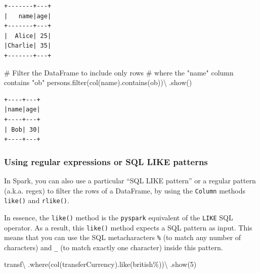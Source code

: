 \documentclass[
  11pt,
  letterpaper,
  DIV=11,
  numbers=noendperiod]{scrreprt}
\newenvironment{Shaded}{\begin{snugshade}}{\end{snugshade}}
\newcommand{\BuiltInTok}[1]{\textcolor[rgb]{0.00,0.23,0.31}{#1}}
\newcommand{\CommentTok}[1]{\textcolor[rgb]{0.37,0.37,0.37}{#1}}
\newcommand{\DecValTok}[1]{\textcolor[rgb]{0.68,0.00,0.00}{#1}}
\newcommand{\NormalTok}[1]{\textcolor[rgb]{0.00,0.23,0.31}{#1}}
\newcommand{\OperatorTok}[1]{\textcolor[rgb]{0.37,0.37,0.37}{#1}}
\newcommand{\StringTok}[1]{\textcolor[rgb]{0.13,0.47,0.30}{#1}}
\begin{document}
\begin{verbatim}
+-------+---+
|   name|age|
+-------+---+
|  Alice| 25|
|Charlie| 35|
+-------+---+
\end{verbatim}

\begin{Shaded}
\begin{Highlighting}[]
\CommentTok{\# Filter the DataFrame to include only rows}
\CommentTok{\# where the "name" column contains "ob"}
\NormalTok{persons.}\BuiltInTok{filter}\NormalTok{(col(}\StringTok{\textquotesingle{}name\textquotesingle{}}\NormalTok{).contains(}\StringTok{\textquotesingle{}ob\textquotesingle{}}\NormalTok{))}\OperatorTok{\textbackslash{}}
\NormalTok{  .show()}
\end{Highlighting}
\end{Shaded}

\begin{verbatim}
+----+---+
|name|age|
+----+---+
| Bob| 30|
+----+---+
\end{verbatim}

\hypertarget{sec-filter-regex-pattern}{%
\subsubsection{Using regular expressions or SQL LIKE
patterns}\label{sec-filter-regex-pattern}}

In Spark, you can also use a particular ``SQL LIKE pattern'' or a
regular pattern (a.k.a. regex) to filter the rows of a DataFrame, by
using the \texttt{Column} methods \texttt{like()} and \texttt{rlike()}.

In essence, the \texttt{like()} method is the \texttt{pyspark}
equivalent of the \texttt{LIKE} SQL operator. As a result, this
\texttt{like()} method expects a SQL pattern as input. This means that
you can use the SQL metacharacters \texttt{\%} (to match any number of
characters) and \texttt{\_} (to match exactly one character) inside this
pattern.

\begin{Shaded}
\begin{Highlighting}[]
\NormalTok{transf}\OperatorTok{\textbackslash{}}
\NormalTok{  .where(col(}\StringTok{\textquotesingle{}transferCurrency\textquotesingle{}}\NormalTok{).like(}\StringTok{\textquotesingle{}british\%\textquotesingle{}}\NormalTok{))}\OperatorTok{\textbackslash{}}
\NormalTok{  .show(}\DecValTok{5}\NormalTok{)}
\end{Highlighting}
\end{Shaded}
\end{document}
